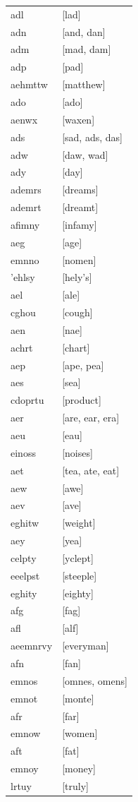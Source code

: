 \documentclass{article}
\begin{document}
\begin{tabular}{ll}
adl & [lad] \\
adn & [and, dan] \\
adm & [mad, dam] \\
adp & [pad] \\
aehmttw & [matthew] \\
ado & [ado] \\
aenwx & [waxen] \\
ads & [sad, ads, das] \\
adw & [daw, wad] \\
ady & [day] \\
ademrs & [dreams] \\
ademrt & [dreamt] \\
afimny & [infamy] \\
aeg & [age] \\
emnno & [nomen] \\
'ehlsy & [hely's] \\
ael & [ale] \\
cghou & [cough] \\
aen & [nae] \\
achrt & [chart] \\
aep & [ape, pea] \\
aes & [sea] \\
cdoprtu & [product] \\
aer & [are, ear, era] \\
aeu & [eau] \\
einoss & [noises] \\
aet & [tea, ate, eat] \\
aew & [awe] \\
aev & [ave] \\
eghitw & [weight] \\
aey & [yea] \\
celpty & [yclept] \\
eeelpst & [steeple] \\
eghity & [eighty] \\
afg & [fag] \\
afl & [alf] \\
aeemnrvy & [everyman] \\
afn & [fan] \\
emnos & [omnes, omens] \\
emnot & [monte] \\
afr & [far] \\
emnow & [women] \\
aft & [fat] \\
emnoy & [money] \\
lrtuy & [truly] \\

\end{tabular}
\end{document}
